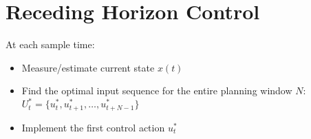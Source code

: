 \ETHslide
\section*{Receding Horizon Control}
\vspace*{\fill}

\begin{figure}[h]
\centering
\scalebox{0.6}{

}
\end{figure} 
At each sample time:
\begin{itemize}
\item[\ETHitem] Measure/estimate current state $x(t)$
\item[\ETHitem] Find the optimal input sequence for the entire planning window $N$: $U_t^* = \{ u_t^*, u_{t+1}^*, \ldots, u_{t+N-1}^* \}$
\item[\ETHitem] Implement the first control action $u_t^*$
\end{itemize}

\vspace*{\fill}
\clearpage